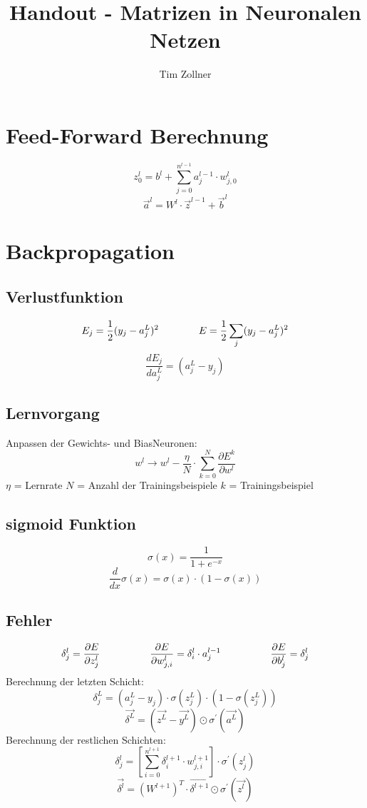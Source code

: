 \documentclass{article}
\begin{document}
\title{Handout - Matrizen in Neuronalen Netzen}
\author{Tim Zollner}

\newpage

\section{Feed-Forward Berechnung}

\[ z_0^l = b^l + \sum_{j=0}^{n^{l-1}} a_j^{l-1} \cdot w_{j,0}^l \]
\[ \vec{a}^l = W^l \cdot \vec{z}^{l-1} + \vec{b}^l \]

\section{Backpropagation}
\subsection{Verlustfunktion}
\[ E_j = \frac{1}{2}(y_j - a_j^L)^2 
\kern 40pt
 E = \frac{1}{2}\sum_{j}^{} (y_j - a_j^L)^2 \]
\[ \frac{dE_j}{da_{j}^L}  = (a_j^L - y_j) \]
\subsection{Lernvorgang}
Anpassen der Gewichts- und BiasNeuronen:
\[ w^l \rightarrow w^l - \frac{\eta}{N} \cdot \sum_{k = 0}^{N} \frac{\partial E^k}{\partial w^l} \]
$\eta$ = Lernrate \kern 20pt $N$ = Anzahl der Trainingsbeispiele \kern 20pt $k$ = Trainingsbeispiel
\subsection{sigmoid Funktion}
\[ \sigma(x) = \frac{1}{1 + e^{-x}} \]
\[ \frac{d}{dx}\sigma(x) = \sigma(x) \cdot (1 - \sigma(x)) \]
\subsection{Fehler}
\[ \delta_j^l = \frac{\partial E}{\partial z_j^l} 
\kern 50pt
 \frac{\partial E}{\partial w_{j,i}^l} = \delta_i^l \cdot a_j^{l-1}
\kern 50pt
\frac{\partial E}{\partial b_j^l} = \delta_j^l \]
Berechnung der letzten Schicht:
\[ \delta_j^L = (a_j^L - y_j) \cdot \sigma (z_j^L) \cdot (1 - \sigma (z_j^L)) \]
\[ \vec{\delta^L} = (\vec{z^L} - \vec{y^L}) \odot \sigma^{\prime}(\vec{a^L}) \]
Berechnung der restlichen Schichten:
\[ \delta_j^{l} = [\sum_{i = 0}^{n^{l+1}} \delta_i^{l+1} \cdot w_{j,i}^{l+1} ] \cdot  \sigma^{\prime}(z_j^{l})  \]
\[ \vec{\delta^l} = {(W^{l+1})}^T \cdot \vec{\delta^{l+1}} \odot \sigma^{\prime}(\vec{z^l}) \]
\end{document}
